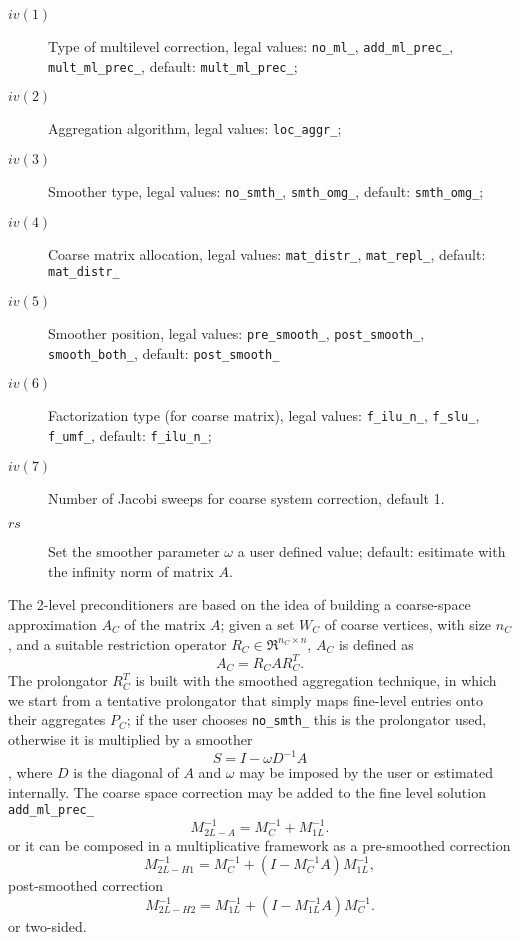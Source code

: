 \begin{description}
\item[$iv(1)$] Type of multilevel correction, legal values: \verb|no_ml_|,
  \verb|add_ml_prec_|, \verb|mult_ml_prec_|,
  default: \verb|mult_ml_prec_|;
\item[$iv(2)$] Aggregation algorithm, legal values: \verb|loc_aggr_|;
\item[$iv(3)$] Smoother type, legal values: \verb|no_smth_|,
  \verb|smth_omg_|, default: \verb|smth_omg_|;
\item[$iv(4)$] Coarse matrix allocation, legal values:
  \verb|mat_distr_|, \verb|mat_repl_|, default: \verb|mat_distr_|
\item[$iv(5)$] Smoother position, legal values: \verb|pre_smooth_|,
  \verb|post_smooth_|, \verb|smooth_both_|, default:
  \verb|post_smooth_|
\item[$iv(6)$] Factorization type (for coarse matrix), legal values: \verb|f_ilu_n_|,
  \verb|f_slu_|, \verb|f_umf_|, default: \verb|f_ilu_n_|;
\item[$iv(7)$] Number of Jacobi sweeps for coarse system correction,
  default 1.
\item[$rs$] Set the smoother parameter $\omega$ a user defined value;
  default: esitimate with the infinity norm of matrix $A$.
\end{description}
The 2-level preconditioners are based on the idea of building a
coarse-space approximation $A_C$ of the matrix $A$; given a set $W_C$
of coarse vertices, with size $n_C$, and a suitable restriction
operator $R_C \in \Re^{n_C \times n}$, $A_C$ is defined as 
\[
A_C=R_C A R_C^T .
\]
The prolongator $R_C^T$ is built with the smoothed aggregation technique,
in which we start from a tentative prolongator that simply maps
fine-level entries onto their aggregates $P_C$; if the user chooses
\verb|no_smth_| this is the prolongator used, otherwise it is
multiplied by a smoother \[ S = I - \omega D^{-1} A \], where $D$ is
the diagonal of $A$ and  $\omega$ may be imposed by the user or
estimated internally.   
The coarse space correction may be added to the fine level solution
\verb|add_ml_prec_|
\[
M_{2L-A}^{-1} = M_{C}^{-1} + M_{1L}^{-1}. 
\]
or it can be composed  in a multiplicative framework as a pre-smoothed
correction
\[
M_{2L-H1}^{-1} = M_{C}^{-1} + \left( I - M_{C}^{-1}A \right) M_{1L}^{-1}, 
\]
post-smoothed correction
\[
M_{2L-H2}^{-1} = M_{1L}^{-1} + \left( I - M_{1L}^{-1}A \right) M_{C}^{-1}. 
\]
or two-sided. 



